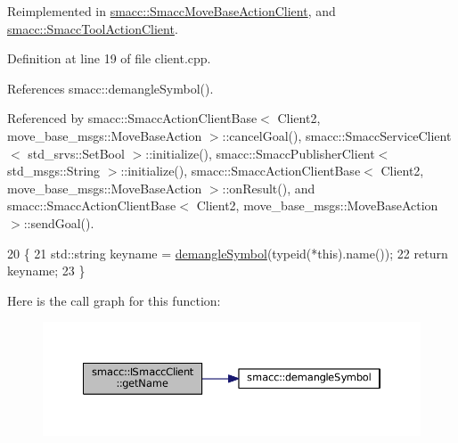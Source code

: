 Reimplemented in \hyperlink{classsmacc_1_1SmaccMoveBaseActionClient_ac90f555fadd3b3c9394aca537a9962f4}{smacc\+::\+Smacc\+Move\+Base\+Action\+Client}, and \hyperlink{classsmacc_1_1SmaccToolActionClient_a07ee35b66e8e8e28c9e39052835515c9}{smacc\+::\+Smacc\+Tool\+Action\+Client}.



Definition at line 19 of file client.\+cpp.



References smacc\+::demangle\+Symbol().



Referenced by smacc\+::\+Smacc\+Action\+Client\+Base$<$ Client2, move\+\_\+base\+\_\+msgs\+::\+Move\+Base\+Action $>$\+::cancel\+Goal(), smacc\+::\+Smacc\+Service\+Client$<$ std\+\_\+srvs\+::\+Set\+Bool $>$\+::initialize(), smacc\+::\+Smacc\+Publisher\+Client$<$ std\+\_\+msgs\+::\+String $>$\+::initialize(), smacc\+::\+Smacc\+Action\+Client\+Base$<$ Client2, move\+\_\+base\+\_\+msgs\+::\+Move\+Base\+Action $>$\+::on\+Result(), and smacc\+::\+Smacc\+Action\+Client\+Base$<$ Client2, move\+\_\+base\+\_\+msgs\+::\+Move\+Base\+Action $>$\+::send\+Goal().


\begin{DoxyCode}
20 \{
21     std::string keyname = \hyperlink{namespacesmacc_a458f5e70d468824fbcd66cc7729deaa8}{demangleSymbol}(\textcolor{keyword}{typeid}(*this).name());
22     \textcolor{keywordflow}{return} keyname;
23 \}
\end{DoxyCode}


Here is the call graph for this function\+:
\nopagebreak
\begin{figure}[H]
\begin{center}
\leavevmode
\includegraphics[width=350pt]{classsmacc_1_1ISmaccClient_a20846aabfd1de832aa27d7a8237a1742_cgraph}
\end{center}
\end{figure}




